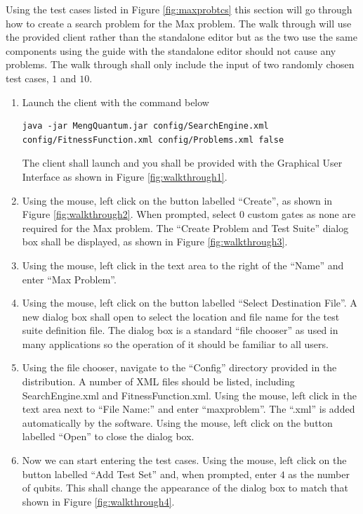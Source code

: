 Using the test cases listed in Figure \ref{fig:maxprobtcs} this section will go through how to create a search problem for the Max problem.
The walk through will use the provided client rather than the standalone editor but as the two use the same components using the guide with the standalone editor should not cause any problems.
The walk through shall only include the input of two randomly chosen test cases, $1$ and $10$.

\lstset{language=bash,breaklines=true,breakatwhitespace=false,numbers=none}
\begin{enumerate}
 \item Launch the client with the command below
\begin{lstlisting}
java -jar MengQuantum.jar config/SearchEngine.xml config/FitnessFunction.xml config/Problems.xml false
\end{lstlisting}
The client shall launch and you shall be provided with the Graphical User Interface as shown in Figure \ref{fig:walkthrough1}.

\item Using the mouse, left click on the button labelled ``Create'', as shown in Figure \ref{fig:walkthrough2}.
When prompted, select 0 custom gates as none are required for the Max problem.
The ``Create Problem and Test Suite'' dialog box shall be displayed, as shown in Figure \ref{fig:walkthrough3}.

\item Using the mouse, left click in the text area to the right of the ``Name'' and enter ``Max Problem''.

\item Using the mouse, left click on the button labelled ``Select Destination File''.
A new dialog box shall open to select the location and file name for the test suite definition file.
The dialog box is a standard ``file chooser'' as used in many applications so the operation of it should be familiar to all users.

\item Using the file chooser, navigate to the ``Config'' directory provided in the distribution.
A number of XML files should be listed, including SearchEngine.xml and FitnessFunction.xml.
Using the mouse, left click in the text area next to ``File Name:'' and enter ``maxproblem''.
The ``.xml'' is added automatically by the software.
Using the mouse, left click on the button labelled ``Open'' to close the dialog box.

\item Now we can start entering the test cases.
Using the mouse, left click on the button labelled ``Add Test Set'' and, when prompted, enter $4$ as the number of qubits.
This shall change the appearance of the dialog box to match that shown in Figure \ref{fig:walkthrough4}.


\end{enumerate}
